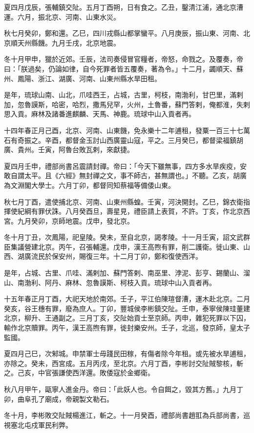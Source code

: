 \begin{pinyinscope}
夏四月戊辰，張輔鎮交阯。五月丁酉朔，日有食之。乙丑，鑿清江浦，通北京漕運。六月，振北京、河南、山東水災。

秋七月癸卯，鄭和還。乙巳，四川戎縣山都掌蠻平。八月庚辰，振山東、河南、北京順天州縣饑。九月壬戌，北京地震。

冬十月甲申，獵於近郊。壬辰，法司奏侵冒官糧者，帝怒，命戮之。及覆奏，帝曰：「朕過矣，仍論如律，自今死罪者皆五覆奏，著為令。」十二月，蠲順天、蘇州、鳳陽、浙江、湖廣、河南、山東州縣水旱田租。

是年，琉球山南、山北，爪哇西王，占城，古里，柯枝，南渤利，甘巴里，滿剌加，忽魯謨斯，哈密，哈烈，撒馬兒罕，火州，土魯番，蘇門答剌，俺都淮，失剌思入貢。麻林及諸番進麒麟、天馬、神鹿。琉球中山入貢者再。

十四年春正月己酉，北京、河南、山東饑，免永樂十二年逋租，發粟一百三十七萬石有奇振之。辛酉，都督金玉討山西廣靈山寇，平之。三月癸巳，都督梁福鎮胡廣、貴州。壬寅，阿魯台敗瓦剌，來獻捷。

夏四月壬申，禮部尚書呂震請封禪。帝曰：「今天下雖無事，四方多水旱疾疫，安敢自謂太平。且《六經》無封禪之文，事不師古，甚無謂也。」不聽。乙亥，胡廣為文淵閣大學士。六月丁卯，都督同知蔡福等備倭山東。

秋七月丁酉，遣使捕北京、河南、山東州縣蝗。壬寅，河決開封。乙巳，錦衣衛指揮使紀綱有罪伏誅。八月癸酉旦，壽星見，禮臣請上表賀，不許。丁亥，作北京西宮。九月癸卯，京師地震。戊申，發北京。

冬十月丁丑，次鳳陽，祀皇陵。癸未，至自北京，謁孝陵。十一月壬寅，詔文武群臣集議營建北京。丙午，召張輔還。戊申，漢王高煦有罪，削二護衛。徙山東、山西、湖廣流民於保安州，賜復三年。十二月丁卯，鄭和復使西洋。

是年，占城、古里、爪哇、滿剌加、蘇門答剌、南巫里、浡泥、彭亨、錫蘭山、溜山、南渤利、阿丹、麻林、忽魯謨斯、柯枝入貢。琉球中山入貢者再。

十五年春正月丁酉，大祀天地於南郊。壬子，平江伯陳瑄督漕，運木赴北京。二月癸亥，谷王橞有罪，廢為庶人。丁卯，豐城侯李彬鎮交阯。壬申，泰寧侯陳珪董建北京，柳升、王通副之。三月丁亥，交阯始貢士至京師。丙申，雜犯死罪以下囚，輸作北京贖罪。丙午，漢王高煦有罪，徙封樂安州。壬子，北巡，發京師，皇太子監國。

夏四月己巳，次邾城。申禁軍士毋踐民田稼，有傷者除今年租。或先被水旱逋租，亦除之。癸未，西宮成。五月丙戌，至北京。六月丁酉，李彬討交阯賊黎核，斬之。己亥，中官張謙使西洋還。敗倭寇於金鄉衛。

秋八月甲午，甌寧人進金丹。帝曰：「此妖人也。令自餌之，毀其方舊。」九月丁卯，曲阜孔了廟成，帝親製文勒石。

冬十月，李彬敗交阯賊楊進江，斬之。十一月癸酉，禮部尚書趙羾為兵部尚書，巡視塞北屯戍軍民利弊。


\end{pinyinscope}
